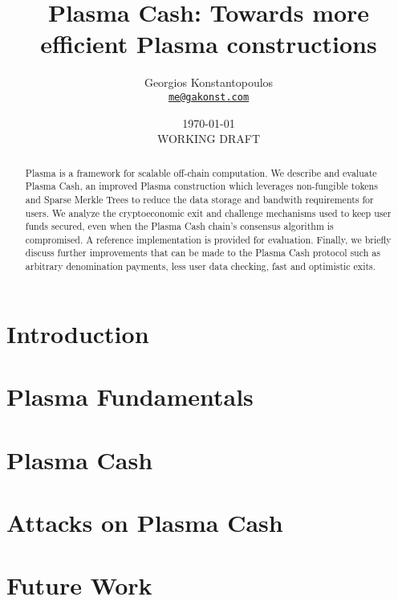 \documentclass[letterpaper, 11pt]{article}
\title{\LARGE Plasma Cash: Towards more efficient Plasma constructions}
\author{
                Georgios Konstantopoulos\\
                \footnotesize\href{mailto:me@gakonst.com}
                        {\nolinkurl{me@gakonst.com}}
        }
\date{\today\\\small WORKING DRAFT }%
\begin{document}
\maketitle

\begin{abstract}
    Plasma is a framework for scalable off-chain computation.
    We describe and evaluate Plasma Cash, an improved Plasma construction 
    which leverages non-fungible tokens and Sparse Merkle Trees to reduce the
    data storage and bandwith requirements for users. 
    We analyze the cryptoeconomic exit and challenge mechanisms used to keep user funds secured, even when the Plasma Cash chain's
    consensus algorithm is compromised. A reference implementation is provided
    for evaluation. Finally, we briefly discuss further improvements that
    can be made to the Plasma Cash protocol such as arbitrary denomination
    payments, less user data checking, fast and optimistic exits.
\end{abstract}

\tableofcontents

\section{Introduction}


\section{Plasma Fundamentals}


\section{Plasma Cash}


\section{Attacks on Plasma Cash} \label{ch:attacks}


\section{Future Work}

\end{document}
